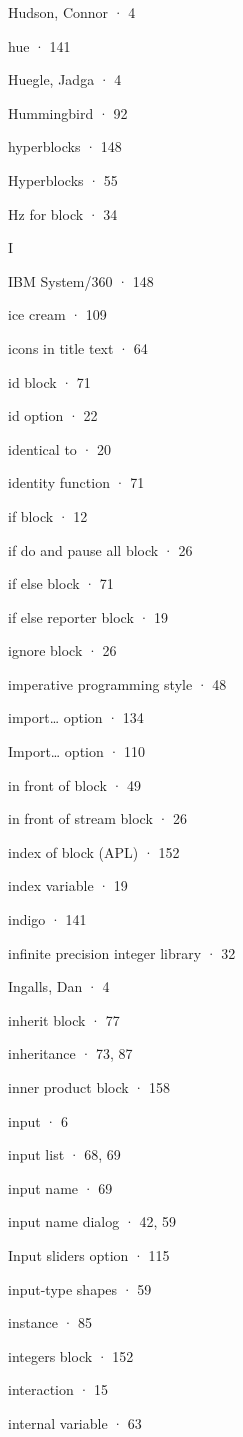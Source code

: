 Hudson, Connor · 4

hue · 141

Huegle, Jadga · 4

Hummingbird · 92

hyperblocks · 148

Hyperblocks · 55

Hz for block · 34

I

IBM System/360 · 148

ice cream · 109

icons in title text · 64

id block · 71

id option · 22

identical to · 20

identity function · 71

if block · 12

if do and pause all block · 26

if else block · 71

if else reporter block · 19

ignore block · 26

imperative programming style · 48

import\ldots{} option · 134

Import\ldots{} option · 110

in front of block · 49

in front of stream block · 26

index of block (APL) · 152

index variable · 19

indigo · 141

infinite precision integer library · 32

Ingalls, Dan · 4

inherit block · 77

inheritance · 73, 87

inner product block · 158

input · 6

input list · 68, 69

input name · 69

input name dialog · 42, 59

Input sliders option · 115

input-type shapes · 59

instance · 85

integers block · 152

interaction · 15

internal variable · 63

